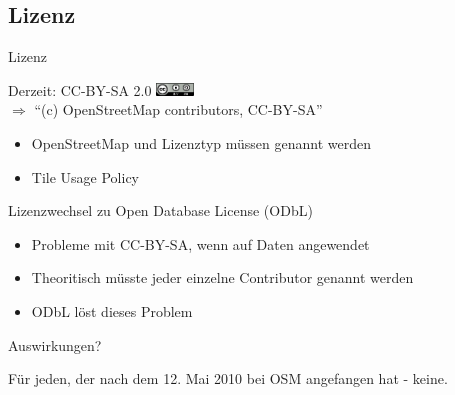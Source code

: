 \documentclass{beamer}
\begin{document}



\subsection{Lizenz}
\begin{frame}{Lizenz}

Derzeit: CC-BY-SA 2.0 \includegraphics[width=1cm]{cc-by-sa.png} \\
$\Rightarrow$ ``(c) OpenStreetMap contributors, CC-BY-SA''

\begin{itemize}
  \item OpenStreetMap und Lizenztyp müssen genannt werden
  \pause
  \item Tile Usage Policy
\end{itemize}

\pause

Lizenzwechsel zu Open Database License (ODbL)

\begin{itemize}
  \item Probleme mit CC-BY-SA, wenn auf Daten angewendet
  \item Theoritisch müsste jeder einzelne Contributor genannt werden
  \item ODbL löst dieses Problem
\end{itemize}

\pause

Auswirkungen?

Für jeden, der nach dem 12. Mai 2010 bei OSM angefangen hat - keine.

\end{frame}
\end{document}
